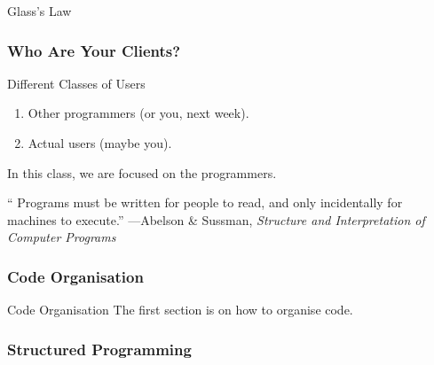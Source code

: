 \begin{frame}[fragile]
Glass's Law 
\end{frame}

\begin{frame}[fragile]
\frametitle{Who Are Your Clients?}
\begin{block}{Different Classes of Users}
\begin{enumerate}
\item Other programmers (or you, next week).
\item Actual users (maybe you).
\end{enumerate}
\end{block}

In this class, we are focused on the programmers.
\end{frame}

\begin{frame}[fragile]

`` Programs must be written for people to read, and only incidentally for machines to execute.''
---Abelson \& Sussman, \textit{Structure and Interpretation of Computer Programs}

\end{frame}



\begin{frame}[fragile]
\frametitle{Code Organisation}

\begin{block}{Code Organisation}
The first section is on how to organise code.
\end{block}
\end{frame}

\begin{frame}[fragile]
\frametitle{Structured Programming}
\end{frame}

